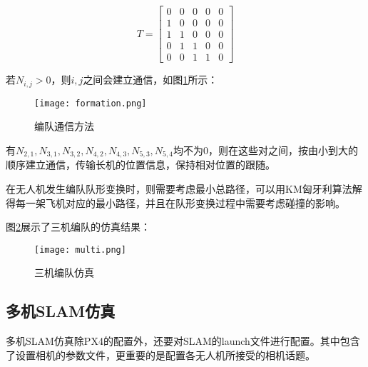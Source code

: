 $$
T=\begin{bmatrix}
0 & 0 & 0 & 0 & 0\\
1 & 0 & 0 & 0 & 0\\
1 & 1 & 0 & 0 & 0\\
0 & 1 & 1 & 0 & 0\\
0 & 0 & 1 & 1 & 0
\end{bmatrix}
$$

若$N_{i,j}>0$，则$i,j$之间会建立通信，如图\ref{fig4-7}所示：

\begin{figure}[!ht]
	\centering
	\texttt{[image: formation.png]}
	\caption{编队通信方法}
	\label{fig4-7}
\end{figure}

有$N_{2,1},N_{3,1},N_{3,2},N_{4,2},N_{4,3},N_{5,3},N_{5,4}$均不为0，则在这些对之间，按由小到大的顺序建立通信，传输长机的位置信息，保持相对位置的跟随。

在无人机发生编队队形变换时，则需要考虑最小总路径，可以用KM匈牙利算法解得每一架飞机对应的最小路径，并且在队形变换过程中需要考虑碰撞的影响。

图\ref{fig4-8}展示了三机编队的仿真结果：

\begin{figure}[!ht]
	\centering
	\texttt{[image: multi.png]}
	\caption{三机编队仿真}
	\label{fig4-8}
\end{figure}




\subsection{多机SLAM仿真} \label{4.3.3}

多机SLAM仿真除PX4的配置外，还要对SLAM的launch文件进行配置。其中包含了设置相机的参数文件，更重要的是配置各无人机所接受的相机话题。

